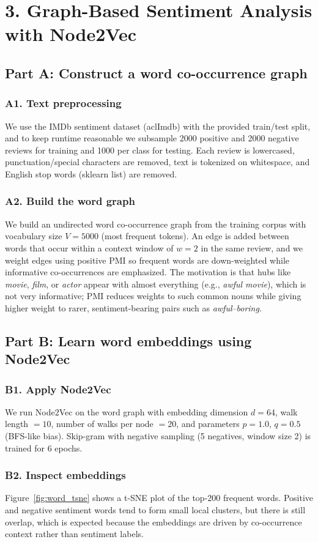 \documentclass{article}
\begin{document}
\section{3. Graph-Based Sentiment Analysis with Node2Vec}
\subsection{Part A: Construct a word co-occurrence graph}
\subsubsection{A1. Text preprocessing}
We use the IMDb sentiment dataset (aclImdb) with the provided train/test split, and to keep runtime reasonable we subsample 2000 positive and 2000 negative reviews for training and 1000 per class for testing. Each review is lowercased, punctuation/special characters are removed, text is tokenized on whitespace, and English stop words (sklearn list) are removed.
\subsubsection{A2. Build the word graph}
We build an undirected word co-occurrence graph from the training corpus with vocabulary size $V=5000$ (most frequent tokens). An edge is added between words that occur within a context window of $w=2$ in the same review, and we weight edges using positive PMI so frequent words are down-weighted while informative co-occurrences are emphasized. The motivation is that hubs like \textit{movie}, \textit{film}, or \textit{actor} appear with almost everything (e.g., \textit{awful movie}), which is not very informative; PMI reduces weights to such common nouns while giving higher weight to rarer, sentiment-bearing pairs such as \textit{awful}--\textit{boring}.

\subsection{Part B: Learn word embeddings using Node2Vec}
\subsubsection{B1. Apply Node2Vec}
We run Node2Vec on the word graph with embedding dimension $d=64$, walk length $=10$, number of walks per node $=20$, and parameters $p=1.0$, $q=0.5$ (BFS-like bias). Skip-gram with negative sampling (5 negatives, window size 2) is trained for 6 epochs.
\subsubsection{B2. Inspect embeddings}
Figure~\ref{fig:word_tsne} shows a t-SNE plot of the top-200 frequent words. Positive and negative sentiment words tend to form small local clusters, but there is still overlap, which is expected because the embeddings are driven by co-occurrence context rather than sentiment labels.
\end{document}
